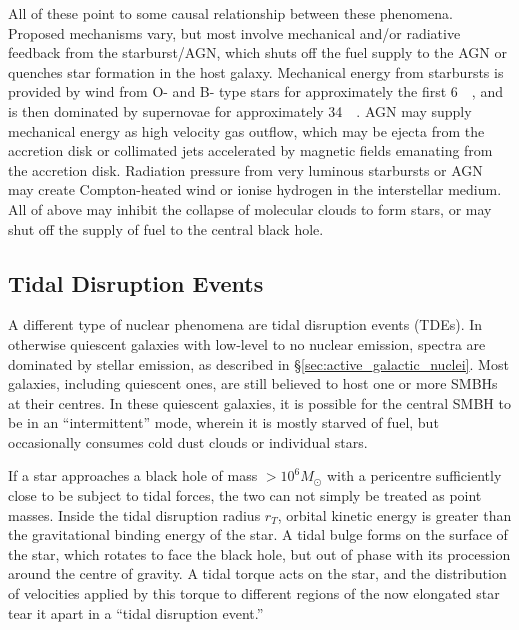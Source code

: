 \documentclass[a4paper,12pt]{article}
\begin{document}
All of these point to some causal relationship between these phenomena.
Proposed mechanisms vary, but most involve mechanical and/or radiative feedback
from the starburst/AGN, which shuts off the fuel supply to the AGN or quenches
star formation in the host galaxy. Mechanical energy from starbursts is
provided by wind from O- and B- type stars for approximately the first
\SI{6}{\mega\year}, and is then dominated by supernovae for approximately
\SI{34}{\mega\year}. AGN may supply mechanical energy as high velocity gas
outflow, which may be ejecta from the accretion disk or collimated jets
accelerated by magnetic fields emanating from the accretion disk. Radiation
pressure from very luminous starbursts or AGN may create Compton-heated wind or
ionise hydrogen in the interstellar medium. All of above may inhibit the
collapse of molecular clouds to form stars, or may shut off the supply of fuel
to the central black hole.\cite{Veilleux_2008}

\subsection{Tidal Disruption Events}\label{sec:tidal_disruption_events}

A different type of nuclear phenomena are tidal disruption events (TDEs). In
otherwise quiescent galaxies with low-level to no nuclear emission, spectra are
dominated by stellar emission, as described in
\S\ref{sec:active_galactic_nuclei}. Most galaxies, including quiescent ones,
are still believed to host one or more SMBHs at their centres.\cite{Rees_1988}
In these quiescent galaxies, it is possible for the central SMBH to be in an
``intermittent'' mode, wherein it is mostly starved of fuel, but occasionally
consumes cold dust clouds or individual stars.\cite{Holoien_2016a, Rees_1988,
Evans_1989}

If a star approaches a black hole of mass $>10^6M_\odot$ with a pericentre
sufficiently close to be subject to tidal forces, the two can not simply be
treated as point masses. Inside the tidal disruption radius $r_T$, orbital
kinetic energy is greater than the gravitational binding energy of the star. A
tidal bulge forms on the surface of the star, which rotates to face the black
hole, but out of phase with its procession around the centre of gravity. A
tidal torque acts on the star, and the distribution of velocities applied by
this torque to different regions of the now elongated star tear it apart in a
``tidal disruption event.''\cite{Rees_1988, Evans_1989}
\end{document}
